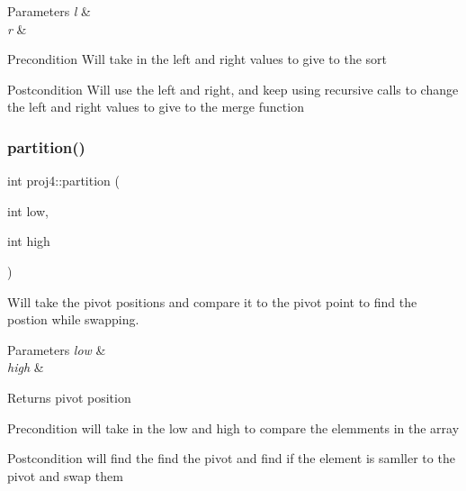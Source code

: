 \begin{DoxyParams}{Parameters}
{\em l} & \\
\hline
{\em r} & \\
\hline
\end{DoxyParams}
\begin{DoxyPrecond}{Precondition}
Will take in the left and right values to give to the sort 
\end{DoxyPrecond}
\begin{DoxyPostcond}{Postcondition}
Will use the left and right, and keep using recursive calls to change the left and right values to give to the merge function 
\end{DoxyPostcond}
\mbox{\label{classproj4_a26fd85cdceb9263023c66f6444d1282d}} 
\subsubsection{\texorpdfstring{partition()}{partition()}}
{\footnotesize\ttfamily int proj4\+::partition (\begin{DoxyParamCaption}\item[{int}]{low,  }\item[{int}]{high }\end{DoxyParamCaption})}



Will take the pivot positions and compare it to the pivot point to find the postion while swapping. 


\begin{DoxyParams}{Parameters}
{\em low} & \\
\hline
{\em high} & \\
\hline
\end{DoxyParams}
\begin{DoxyReturn}{Returns}
pivot position 
\end{DoxyReturn}
\begin{DoxyPrecond}{Precondition}
will take in the low and high to compare the elemments in the array 
\end{DoxyPrecond}
\begin{DoxyPostcond}{Postcondition}
will find the find the pivot and find if the element is samller to the pivot and swap them 
\end{DoxyPostcond}
\mbox{\label{classproj4_ab413a8d7e60015de7a27dc0817a1a655}} 
